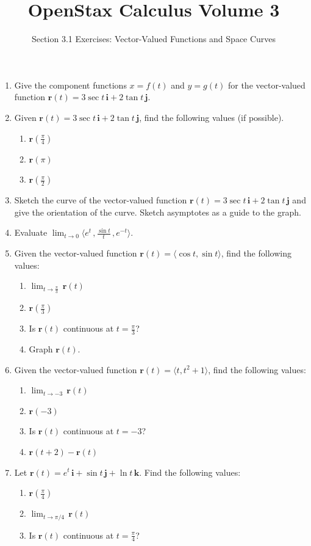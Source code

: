 \documentclass{exercises}
\title{OpenStax Calculus Volume 3}
\subtitle{Section 3.1 Exercises: Vector-Valued Functions and Space Curves}
\author{}
\date{}
\begin{document}
\maketitle

\begin{enumerate}[start=1]
\item Give the component functions $x=f(t)$ and $y=g(t)$ for the vector-valued function $\mathbf{r}(t)=3\sec t\,\mathbf{i}+2\tan t\,\mathbf{j}$.
\item Given $\mathbf{r}(t)=3\sec t\,\mathbf{i}+2\tan t\,\mathbf{j}$, find the following values (if possible).
\begin{enumerate}[label=(\alph*)]
  \item $\mathbf{r}(\frac{\pi}{4})$
  \item $\mathbf{r}(\pi)$
  \item $\mathbf{r}(\frac{\pi}{2})$
\end{enumerate}
\item Sketch the curve of the vector-valued function $\mathbf{r}(t)=3\sec t\,\mathbf{i}+2\tan t\,\mathbf{j}$ and give the orientation of the curve. Sketch asymptotes as a guide to the graph.
\item Evaluate $\lim_{t\to0}\langle e^{t}\,,\frac{\sin t}{t}\,,e^{-t}\rangle$.
\item Given the vector-valued function $\mathbf{r}(t)=\langle \cos t,\sin t\rangle$, find the following values:
\begin{enumerate}[label=(\alph*)]
  \item $\lim_{t\to \frac{\pi}{3}}\,\mathbf{r}(t)$
  \item $\mathbf{r}(\frac{\pi}{3})$
  \item Is $\mathbf{r}(t)$ continuous at $t=\frac{\pi}{3}$?
  \item Graph $\mathbf{r}(t)$.
\end{enumerate}
\item Given the vector-valued function $\mathbf{r}(t)=\langle t,t^{2}+1\rangle$, find the following values:
\begin{enumerate}[label=(\alph*)]
  \item $\lim_{t\to-3}\,\mathbf{r}(t)$
  \item $\mathbf{r}(-3)$
  \item Is $\mathbf{r}(t)$ continuous at $t=-3$?
  \item $\mathbf{r}(t+2)-\mathbf{r}(t)$
\end{enumerate}
\item Let $\mathbf{r}(t)=e^{t}\,\mathbf{i}+\sin t\,\mathbf{j}+\ln t\,\mathbf{k}$. Find the following values:
\begin{enumerate}[label=(\alph*)]
  \item $\mathbf{r}(\frac{\pi}{4})$
  \item $\lim_{t\to \pi/4}\,\mathbf{r}(t)$
  \item Is $\mathbf{r}(t)$ continuous at $t=\frac{\pi}{4}$?
\end{enumerate}
\end{enumerate}
\end{document}

